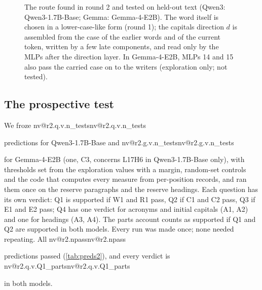 \documentclass[11pt]{article}
\makeatletter
\newcommand{\nv}[1]{\ifcsname nv@#1\endcsname\csname nv@#1\endcsname\else\PackageError{numbers}{Unknown number key #1}{}\fi}
\newcommand{\gm}{Gemma-4-E2B}
\newcommand{\qw}{Qwen3-1.7B-Base}
\newcommand{\hd}[2]{L#1H#2}
\newcommand{\RQ}[1]{\nv{r2.q.#1}}
\makeatother
\begin{document}
\begin{figure}[t]
\centering
{}
\caption{The route found in round 2 and tested on held-out text (Qwen3: \qw{}; Gemma: \gm{}). The word itself is chosen in a lower-case-like form (round 1); the capitals direction $d$ is assembled from the case of the earlier words and of the current token, written by a few late components, and read only by the MLPs after the direction layer. In \gm{}, MLPs 14 and 15 also pass the carried case on to the writers (exploration only; not tested).}
\label{fig:route}
\end{figure}

\subsection{The prospective test}

We froze \nv{r2.q.v.n_tests} predictions for \qw{} and \nv{r2.g.v.n_tests} for \gm{} (one, C3, concerns \hd{17}{6} in \qw{} only), with thresholds set from the exploration values with a margin, random-set controls and the code that computes every measure from per-position records, and ran them once on the reserve paragraphs and the reserve headings. Each question has its own verdict: Q1 is supported if W1 and R1 pass, Q2 if C1 and C2 pass, Q3 if E1 and E2 pass; Q4 has one verdict for acronyms and initial capitals (A1, A2) and one for headings (A3, A4). The parts account counts as supported if Q1 and Q2 are supported in both models. Every run was made once; none needed repeating. All \nv{r2.npass} predictions passed (\cref{tab:preds2}), and every verdict is \RQ{v.Q1_parts} in both models.
\end{document}
